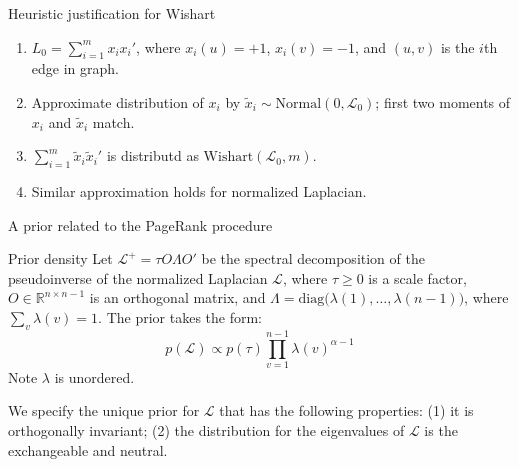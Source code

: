 \documentclass[xcolor=dvipsnames]{beamer}
\begin{document}
\begin{frame}
\begin{block}{Heuristic justification for Wishart}
  \begin{enumerate}
  
    \item $L_0 = \sum_{i=1}^{m} x_i x_i'$, where $x_i(u) = +1$, $x_i(v) = -1$,
    and $(u,v)$ is the $i$th edge in graph.

    \item Approximate distribution of $x_i$ by $\tilde x_i \sim
    \mathrm{Normal}(0, \mathcal{L}_0)$; first two moments of $x_i$ and $\tilde
    x_i$ match.

    \item $\sum_{i=1}^m \tilde x_i \tilde x_i'$ is distributd as
    $\mathrm{Wishart}(\mathcal{L}_0, m)$.

    \item Similar approximation holds for normalized Laplacian.

  \end{enumerate}
\end{block}
\end{frame}


\begin{frame}[c]
  \begin{block}{}
  \begin{center}
    \huge{A prior related to the PageRank procedure}
  \end{center}
  \end{block}
\end{frame}


\begin{frame}
  \begin{block}{Prior density}
    Let $\mathcal{L}^{+} = \tau O \Lambda O'$ be the spectral decomposition of
    the pseudoinverse of the normalized Laplacian $\mathcal{L}$, where
    $\tau \geq 0$ is a scale factor, $O \in \mathbb{R}^{n \times n - 1}$ is
    an orthogonal matrix, and
    $\Lambda = \mathrm{diag}\big(\lambda(1), \dotsc, \lambda(n-1)\big)$,
    where $\sum_v \lambda(v) = 1$.  The prior takes the form:
    \[
      p(\mathcal{L}) \propto p(\tau) \prod_{v=1}^{n-1} \lambda(v)^{\alpha - 1}
    \]
    Note $\lambda$ is unordered.
  \end{block}

  We specify the unique prior for $\mathcal{L}$ that has the following properties:
  (1) it is orthogonally invariant; (2) the distribution for the eigenvalues
  of $\mathcal{L}$ is the exchangeable and neutral.
\end{frame}
\end{document}
